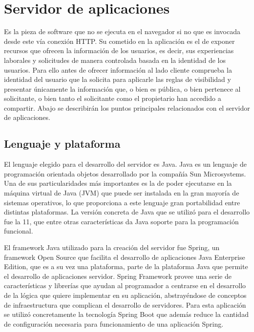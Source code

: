 \documentclass[a4paper, 12pt]{book}
\begin{document}
\section{Servidor de aplicaciones}
\label{sec:intro_applicationserver}

Es la pieza de software que no se ejecuta en el navegador si no que es invocada desde este vía conexión HTTP. 
Su cometido en la aplicación es el de exponer recursos que ofrecen la información de los usuarios, es decir, sus experiencias laborales y solicitudes de manera controlada basada en la identidad de los usuarios. 
Para ello antes de ofrecer información al lado cliente comprueba la identidad del usuario que la solicita para aplicarle las reglas de visibilidad y presentar únicamente la información que, 
o bien es pública, o bien pertenece al solicitante, o bien tanto el solicitante como el propietario han accedido a compartir. Abajo se describirán los puntos principales relacionados con el servidor de aplicaciones.

\subsection{Lenguaje y plataforma}
\label{subsec:intro_applicationserver_languageandplatform}

El lenguaje elegido para el desarrollo del servidor es Java. Java es un lenguaje de programación orientada objetos desarrollado por la compañía Sun Microsystems. 
Una de sus particularidades más importantes es la de poder ejecutarse en la máquina virtual de Java (JVM) que puede ser instalada en la gran mayoría de sistemas operativos, 
lo que proporciona a este lenguaje gran portabilidad entre distintas plataformas. La versión concreta de Java que se utilizó para el desarrollo fue la 11, que entre otras características da Java soporte para la programación funcional.

El framework Java utilizado para la creación del servidor fue Spring, un framework Open Source que facilita el desarrollo de aplicaciones Java Enterprise Edition, que es a su vez una plataforma, parte de la plataforma Java que permite el desarrollo de aplicaciones servidor. 
Spring Framework provee una serie de características y librerías que ayudan al programador a centrarse en el desarrollo de la lógica que quiere implementar en su aplicación, abstrayéndose de conceptos de infraestructura que complican el desarrollo de servidores.
 Para esta aplicación se utilizó concretamente la tecnología Spring Boot que además reduce la cantidad de configuración necesaria para funcionamiento de una aplicación Spring.
\end{document}
